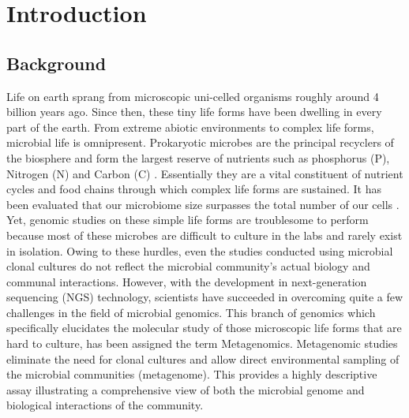 \chapter{Introduction}
 \setcounter{page}{1}

\section*{Background}
Life on earth sprang from microscopic uni-celled organisms roughly around 4 billion years ago. Since then, these tiny life forms have been dwelling in every part of the earth. From extreme abiotic environments to complex life forms, microbial life is omnipresent. Prokaryotic microbes are the principal recyclers of the biosphere and form the largest reserve of nutrients such as phosphorus (P), Nitrogen (N) and Carbon (C) \cite{ref1}. Essentially they are a vital constituent of nutrient cycles and food chains through which complex life forms are sustained. It has been evaluated that our microbiome size surpasses the total number of our cells \cite{ref2}. Yet, genomic studies on these simple life forms are troublesome to perform because most of these microbes are difficult to culture in the labs and rarely exist in isolation. Owing to these hurdles, even the studies conducted using microbial clonal cultures do not reflect the microbial community's actual biology and communal interactions. However, with the development in next-generation sequencing (NGS) technology, scientists have succeeded in overcoming quite a few challenges in the field of microbial genomics. This branch of genomics which specifically elucidates the molecular study of those microscopic life forms that are hard to culture, has been assigned the term Metagenomics. Metagenomic studies eliminate the need for clonal cultures and allow direct environmental sampling of the microbial communities (metagenome). This provides a highly descriptive assay illustrating a comprehensive view of both the microbial genome and biological interactions of the community.

